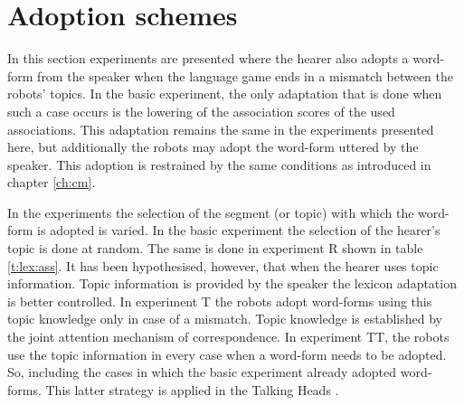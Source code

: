 \section{Adoption schemes}\label{s:lex:ass}

In this section experiments are presented where the hearer also adopts a word-form from the speaker when the language game ends in a mismatch between the robots' topics. In the basic experiment, the only adaptation that is done when such a case occurs is the lowering of the association scores of the used associations. This adaptation remains the same in the experiments presented here, but additionally the robots may adopt the word-form uttered by the speaker. This adoption is restrained by the same conditions as introduced in chapter \ref{ch:cm}.

\p
In the experiments the selection of the segment (or topic) with which the word-form is adopted is varied. In the basic experiment the selection of the hearer's topic is done at random. The same is done in experiment R shown in table \ref{t:lex:ass}. It has been hypothesised, however, that when the hearer uses topic information. Topic information is provided by the speaker the lexicon adaptation is better controlled. In experiment T the robots adopt word-forms using this topic knowledge only in case of a mismatch. Topic knowledge is established by the joint attention mechanism of correspondence. In experiment TT, the robots use the topic information in every case when a word-form needs to be adopted. So, including the cases in which the basic experiment already adopted word-forms. This latter strategy is applied in the Talking Heads \cite{steels:2000}.

